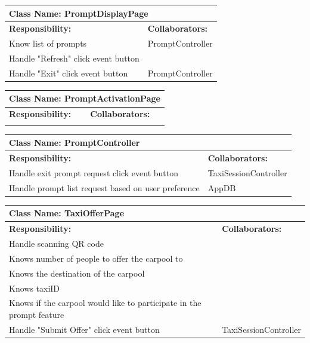 \documentclass[]{article}
\begin{document}
\begin{table}[ht]
\centering
\begin{tabular}{|p{6cm}|p{6cm}|}
\hline 
 \multicolumn{2}{|l|}{\textbf{Class Name: PromptDisplayPage}} \\
\hline
\textbf{Responsibility:} & \textbf{Collaborators:} \\
\hline
Know list of prompts & PromptController\\ \hline
Handle "Refresh" click event button & \\ \hline
Handle "Exit" click event button & PromptController \\ \hline
\end{tabular}
\end{table}

\begin{table}[ht]
\centering
\begin{tabular}{|p{6cm}|p{6cm}|}
\hline 
 \multicolumn{2}{|l|}{\textbf{Class Name: PromptActivationPage}} \\
\hline
\textbf{Responsibility:} & \textbf{Collaborators:} \\
\hline
\vspace{1in} & \\
\hline
\end{tabular}
\end{table}

\begin{table}[ht]
\centering
\begin{tabular}{|p{6cm}|p{6cm}|}
\hline 
 \multicolumn{2}{|l|}{\textbf{Class Name: PromptController}} \\
\hline
\textbf{Responsibility:} & \textbf{Collaborators:} \\
\hline
Handle exit prompt request click event button & TaxiSessionController\\ \hline
Handle prompt list request based on user preference & AppDB\\ \hline
\end{tabular}
\end{table}

\begin{table}[ht]
\centering
\begin{tabular}{|p{6cm}|p{6cm}|}
\hline 
 \multicolumn{2}{|l|}{\textbf{Class Name: TaxiOfferPage}} \\
\hline
\textbf{Responsibility:} & \textbf{Collaborators:} \\
\hline
Handle scanning QR code &  \\ \hline
Knows number of people to offer the carpool to &\\ \hline
Knows the destination of the carpool &\\ \hline
Knows taxiID &\\ \hline
Knows if the carpool would like to participate in the prompt feature & \\ \hline
Handle "Submit Offer" click event button & TaxiSessionController\\ \hline
\end{tabular}
\end{table}
\end{document}
